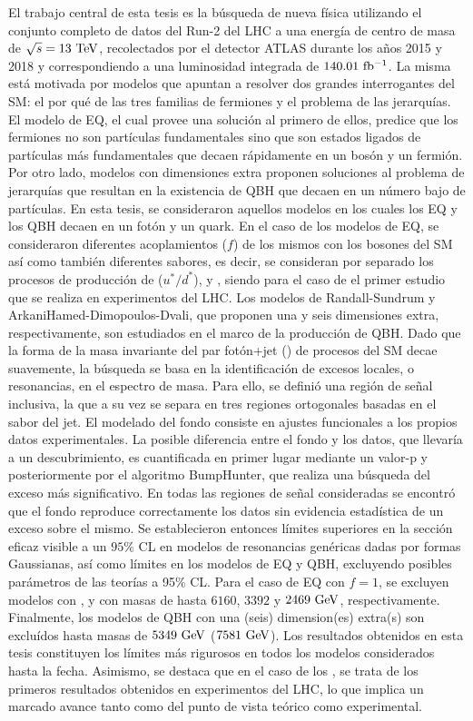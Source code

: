 El trabajo central de esta tesis es la búsqueda de nueva física utilizando el conjunto completo de datos del Run-2 del \ac{LHC} a una energía de centro de masa de \(\sqs = 13~\TeV\), recolectados por el detector \ac{ATLAS} durante los años 2015 y 2018 y correspondiendo a una luminosidad integrada de \(140.01~\ifb\). La misma está motivada por modelos que apuntan a resolver dos grandes interrogantes del \ac{SM}: el por qué de las tres familias de fermiones y el problema de las jerarquías. El modelo de \acf{EQ}, el cual provee una solución al primero de ellos, predice que los fermiones no son partículas fundamentales sino que son estados ligados de partículas más fundamentales que decaen rápidamente en un bosón y un fermión. Por otro lado, modelos con dimensiones extra proponen soluciones al problema de jerarquías que resultan en la existencia de \acf{QBH} que decaen en un número bajo de partículas. En esta tesis, se consideraron aquellos modelos en los cuales los \ac{EQ} y los \ac{QBH} decaen en un fotón y un quark. En el caso de los modelos de \ac{EQ}, se consideraron diferentes acoplamientos (\(f\)) de los mismos con los bosones del \ac{SM} así como también diferentes sabores, es decir, se consideran por separado los procesos de producción de \qstar (\(u^*/d^*\)), \cstar y \bstar, siendo para el caso de \cstar el primer estudio que se realiza en experimentos del \ac{LHC}. Los modelos de Randall-Sundrum y ArkaniHamed-Dimopoulos-Dvali, que proponen una y seis dimensiones extra, respectivamente, son estudiados en el marco de la producción de \ac{QBH}. Dado que la forma de la masa invariante del par fotón+jet (\myj) de procesos del \ac{SM} decae suavemente, la búsqueda se basa en la identificación de excesos locales, o resonancias, en el espectro de masa. Para ello, se definió una región de señal inclusiva, la que a su vez se separa en tres regiones ortogonales basadas en el sabor del jet. El modelado del fondo consiste en ajustes funcionales a los propios datos experimentales. La posible diferencia entre el fondo y los datos, que llevaría a un descubrimiento, es cuantificada en primer lugar mediante un valor-p y posteriormente por el algoritmo BumpHunter, que realiza una búsqueda del exceso más significativo. En todas las regiones de señal consideradas se encontró que el fondo reproduce correctamente los datos sin evidencia estadística de un exceso sobre el mismo. Se establecieron entonces límites superiores en la sección eficaz visible a un \(95\%\) \ac{CL} en modelos de resonancias genéricas dadas por formas Gaussianas, así como límites en los modelos de \ac{EQ} y \ac{QBH}, excluyendo posibles parámetros de las teorías a 95\% \ac{CL}. Para el caso de \ac{EQ} con \(f = 1\), se excluyen modelos con \qstar, \cstar y \bstar con masas de hasta \(6160\), \(3392\) y \(2469~\GeV\), respectivamente. Finalmente, los modelos de \ac{QBH} con una (seis) dimension(es) extra(s) son excluídos hasta masas de \(5349~\GeV\) (\(7581~\GeV\)). Los resultados obtenidos en esta tesis constituyen los límites más rigurosos en todos los modelos considerados hasta la fecha. Asimismo, se destaca que en el caso de los \cstar, se trata de los primeros resultados obtenidos en experimentos del \ac{LHC}, lo que implica un marcado avance tanto como del punto de vista teórico como experimental.